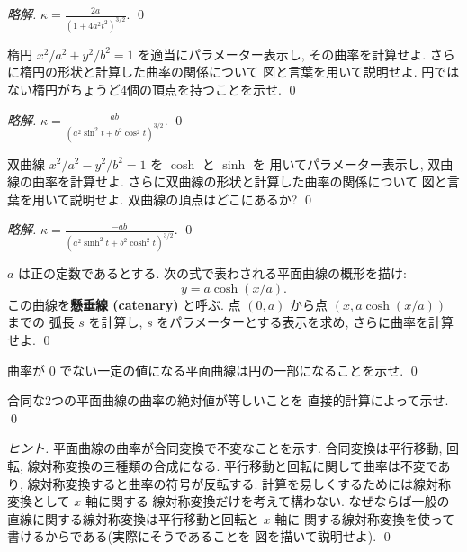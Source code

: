 \documentclass[12pt,twoside]{jarticle}
\newcommand\commentout[1]{#1}
\newcommand\commentout[1]{}
\begin{document}
\commentout{
\begin{proof}[略解]
 $\displaystyle \kappa=\frac{2a}{(1+4a^2t^2)^{3/2}}$.
 \qed
\end{proof}
}

\begin{question}
  楕円 $x^2/a^2 + y^2/b^2 = 1$ を適当にパラメーター表示し, 
 その曲率を計算せよ. 
 さらに楕円の形状と計算した曲率の関係について
 図と言葉を用いて説明せよ.
 円ではない楕円がちょうど4個の頂点を持つことを示せ.
 \qed
\end{question}

\commentout{
\begin{proof}[略解]
 $\displaystyle \kappa=\frac{ab}{(a^2\sin^2t+b^2\cos^2t)^{3/2}}$.
 \qed
\end{proof}
}

\begin{question}
 双曲線 $x^2/a^2-y^2/b^2=1$ を $\cosh$ と $\sinh$ を
 用いてパラメーター表示し, 双曲線の曲率を計算せよ. 
 さらに双曲線の形状と計算した曲率の関係について
 図と言葉を用いて説明せよ.
 双曲線の頂点はどこにあるか?
 \qed
\end{question}

\commentout{
\begin{proof}[略解]
 $\displaystyle \kappa=\frac{-ab}{(a^2\sinh^2t+b^2\cosh^2t)^{3/2}}$.
 \qed
\end{proof}
}

\begin{question}[懸垂線]
  $a$ は正の定数であるとする. 次の式で表わされる平面曲線の概形を描け:
  \begin{equation*}
    y = a \cosh (x/a).
  \end{equation*}
  この曲線を{\bf 懸垂線 (catenary)} と呼ぶ. 
  点 $(0,a)$ から点 $(x,a\cosh(x/a))$ までの
  弧長 $s$ を計算し, $s$ をパラメーターとする表示を求め, 
  さらに曲率を計算せよ.
  \qed
\end{question}

\begin{question}
  曲率が $0$ でない一定の値になる平面曲線は円の一部になることを示せ. \qed
\end{question}

\begin{question}
 合同な2つの平面曲線の曲率の絶対値が等しいことを
 直接的計算によって示せ. \qed
\end{question}

\begin{proof}[ヒント]
 平面曲線の曲率が合同変換で不変なことを示す.
 合同変換は平行移動, 回転, 線対称変換の三種類の合成になる.
 平行移動と回転に関して曲率は不変であり, 
 線対称変換すると曲率の符号が反転する.
 計算を易しくするためには線対称変換として $x$ 軸に関する
 線対称変換だけを考えて構わない. 
 なぜならば一般の直線に関する線対称変換は平行移動と回転と $x$ 軸に
 関する線対称変換を使って書けるからである(実際にそうであることを
 図を描いて説明せよ).
 \qed
\end{proof}
\end{document}
